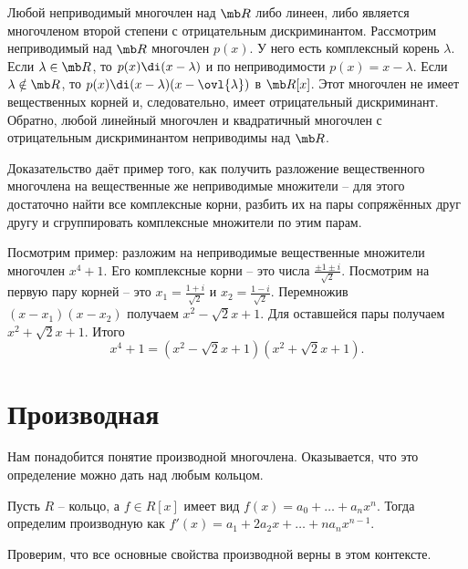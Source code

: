 \thrm Любой неприводимый многочлен над $\mb R$ либо линеен, либо является многочленом второй степени с отрицательным дискриминантом.
\ethrm
\proof Рассмотрим неприводимый над $\mb R$ многочлен $p(x)$. У него есть комплексный корень $\lambda$. Если $\lambda \in \mb R$, то $p(x)\di (x-\lambda)$ и по неприводимости $p(x)=x-\lambda$.  Если $\lambda \notin \mb R$, то $p(x)\di (x-\lambda)(x-\ovl{\lambda})$ в $\mb R[x]$. Этот многочлен не имеет вещественных корней и, следовательно, имеет отрицательный дискриминант. Обратно, любой линейный многочлен и квадратичный многочлен с отрицательным дискриминантом неприводимы над $\mb R$.
\endproof

Доказательство даёт пример того, как получить разложение вещественного многочлена на вещественные же неприводимые множители -- для этого достаточно найти все комплексные корни, разбить их на пары сопряжённых друг другу и сгруппировать комплексные множители по этим парам.

Посмотрим пример: разложим на неприводимые вещественные множители многочлен $x^4+1$. Его комплексные корни -- это числа $\frac{\pm 1\pm i}{\sqrt{2}}$. Посмотрим на первую пару корней  -- это $x_1=\frac{1+i}{\sqrt{2}}$ и $x_2=\frac{1-i}{\sqrt{2}}$. Перемножив $(x-x_1)(x-x_2)$ получаем $x^2-\sqrt{2}x+1$. Для оставшейся пары получаем $x^2+\sqrt{2}x+1$. Итого
$$x^4+1=(x^2-\sqrt{2}x+1)(x^2+\sqrt{2}x+1).$$






\section{Производная}

Нам понадобится понятие производной многочлена. Оказывается, что это определение можно дать над любым кольцом. 

\dfn Пусть $R$ -- кольцо, а $f\in R[x] $ имеет вид $f(x)=a_0+\dots+a_nx^n$. Тогда определим производную как $f'(x)=a_1+2a_2x+\dots+na_nx^{n-1}$.
\edfn

Проверим, что все основные свойства производной верны в этом контексте.

